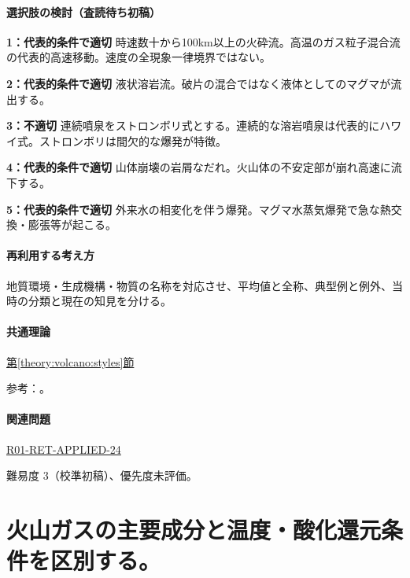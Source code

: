 \paragraph{選択肢の検討（査読待ち初稿）}\mbox{}\par

\noindent\textbf{1：代表的条件で適切} 時速数十から100km以上の火砕流。高温のガス粒子混合流の代表的高速移動。速度の全現象一律境界ではない。\par

\noindent\textbf{2：代表的条件で適切} 液状溶岩流。破片の混合ではなく液体としてのマグマが流出する。\par

\noindent\textbf{3：不適切} 連続噴泉をストロンボリ式とする。連続的な溶岩噴泉は代表的にハワイ式。ストロンボリは間欠的な爆発が特徴。\par

\noindent\textbf{4：代表的条件で適切} 山体崩壊の岩屑なだれ。火山体の不安定部が崩れ高速に流下する。\par

\noindent\textbf{5：代表的条件で適切} 外来水の相変化を伴う爆発。マグマ水蒸気爆発で急な熱交換・膨張等が起こる。\par

\paragraph{再利用する考え方} 地質環境・生成機構・物質の名称を対応させ、平均値と全称、典型例と例外、当時の分類と現在の知見を分ける。

\paragraph{共通理論} \hyperref[theory:volcano:styles]{第\ref*{theory:volcano:styles}節}

\par 参考：\cite{jma_magma1999,vol50_styles_ref,volc_usgs_msh_flow}。

\paragraph{関連問題} \hyperref[q:r01-ret-applied-24]{R01-RET-APPLIED-24}

\par 難易度 3（校準初稿）、優先度未評価。

\section{火山ガスの主要成分と温度・酸化還元条件を区別する。}

